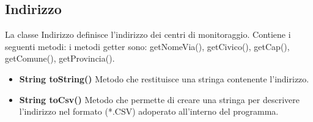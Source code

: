 \documentclass[a4paper, 12pt]{report}
\begin{document}
			\subsection{Indirizzo}
			La classe Indirizzo definisce l'indirizzo dei centri di monitoraggio. Contiene i seguenti metodi:
			i metodi getter sono: getNomeVia(), getCivico(), getCap(), getComune(), getProvincia().
			\begin{itemize}
			\item \textbf{String toString()}
			Metodo che restituisce una stringa contenente l'indirizzo.
			\item \textbf{String toCsv()}
			Metodo che permette di creare una stringa per descrivere l'indirizzo nel formato (*.CSV) adoperato all'interno del programma.
			\end{itemize}
			 
\end{document}
